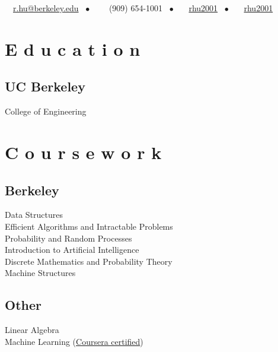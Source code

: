 \documentclass[]{deedy-resume-openfont}
\begin{document}
%
%
{\faEnvelope \ \ \href{mailto:r.hu@berkeley.edu}{r.hu@berkeley.edu} \ \(\bullet\) \ \ \faPhone \ \ (909)  654-1001 \ \(\bullet\) \ \faGithub \ \ \href{https://github.com/rhu2001}{rhu2001} \ \(\bullet\) \ \faLinkedin \ \ \href{https://www.linkedin.com/in/rhu2001/}{rhu2001}}

%
%

\begin{minipage}[t]{0.33\textwidth} 


\section{E d u c a t i o n} 

\subsection{UC Berkeley}
College of Engineering \\
\sectionsep


\section{C o u r s e w o r k}

\subsection{Berkeley}
Data Structures \\
Efficient Algorithms and Intractable Problems \\
Probability and Random Processes \\
Introduction to Artificial Intelligence \\
Discrete Mathematics and Probability Theory \\
Machine Structures \\
\subsection{Other}
Linear Algebra \\
Machine Learning (\href{https://coursera.org/share/f28a9bb54a4cca7c445539ba73aa3d48}{Coursera certified}) \\
\sectionsep


\end{minipage}
\end{document}
